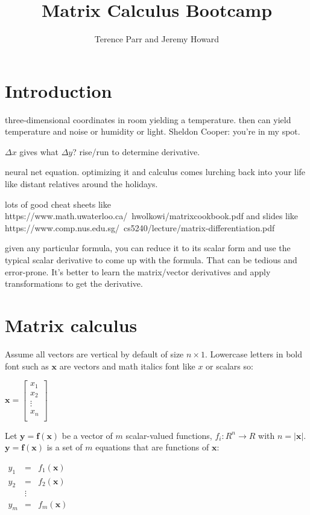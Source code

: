\documentclass[11pt]{article}
\title{Matrix Calculus Bootcamp}
\author{Terence Parr and Jeremy Howard}
\begin{document}
\maketitle

\section{Introduction}

three-dimensional coordinates in room yielding a temperature. then can yield temperature and noise or humidity or light.  Sheldon Cooper: you're in my spot.

$\Delta x$ gives what $\Delta y$? rise/run to determine derivative.

neural net equation. optimizing it and calculus comes lurching back into your life like distant relatives around the holidays.

 lots of good cheat sheets like https://www.math.uwaterloo.ca/~hwolkowi/matrixcookbook.pdf and slides like https://www.comp.nus.edu.sg/~cs5240/lecture/matrix-differentiation.pdf
 
given any particular formula, you can reduce it to its scalar form and use the typical scalar derivative to come up with the formula. That can be tedious and error-prone. It's better to learn the matrix/vector derivatives and apply transformations to get the derivative.
 
\section{Matrix calculus}

Assume all vectors are vertical by default of size $n \times 1$. Lowercase letters in bold font such as $\mathbf{x}$ are vectors and math italics font like $x$ or scalars so:

$\mathbf{x} = \begin{bmatrix}
           x_1\\
           x_2\\
           \vdots \\
           x_n\\
           \end{bmatrix}$

Let $\mathbf{y} = \mathbf{f}(\mathbf{x})$ be a vector of $m$ scalar-valued functions, $f_i : R^n \rightarrow R$ with $n=|\mathbf{x}|$. $\mathbf{y} = \mathbf{f}(\mathbf{x})$ is a set of $m$ equations that are functions of $\mathbf{x}$:

$
\begin{array}{lcl}
y_1 & = & f_1(\mathbf{x})\\
y_2 & = & f_2(\mathbf{x})\\
 & \vdots & \\
y_m & = & f_m(\mathbf{x})\\
\end{array}
$
\end{document}
